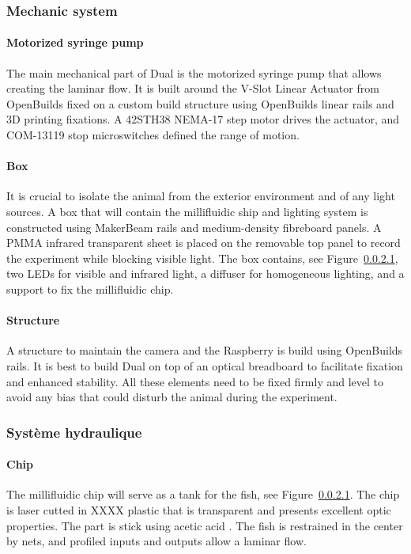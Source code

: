   \subsubsection{Mechanic system}
  \paragraph{Motorized syringe pump} The main mechanical part of Dual is the motorized syringe pump that allows creating the laminar flow. It is built around the V-Slot Linear Actuator from OpenBuilds fixed on a custom build structure using OpenBuilds linear rails and 3D printing fixations. A 42STH38 NEMA-17 step motor drives the actuator, and COM-13119 stop microswitches defined the range of motion.

  \paragraph{Box} It is crucial to isolate the animal from the exterior environment and of any light sources. A box that will contain the millifluidic ship and lighting system is constructed using MakerBeam rails and medium-density fibreboard panels. A PMMA infrared transparent sheet is placed on the removable top panel to record the experiment while blocking visible light. The box contains, see Figure~\ref{}, two LEDs for visible and infrared light, a diffuser for homogeneous lighting, and a support to fix the millifluidic chip.

  \paragraph{Structure} A structure to maintain the camera and the Raspberry is build using OpenBuilds rails. It is best to build Dual on top of an optical breadboard to facilitate fixation and enhanced stability. All these elements need to be fixed firmly and level to avoid any bias that could disturb the animal during the experiment.

  \subsubsection{Système hydraulique}
  \paragraph{Chip} The millifluidic chip will serve as a tank for the fish, see Figure~\ref{}. The chip is laser cutted in XXXX plastic that is transparent and presents excellent optic properties. The part is stick using acetic acid \cite{}. The fish is restrained in the center by nets, and profiled inputs and outputs allow a laminar flow.

